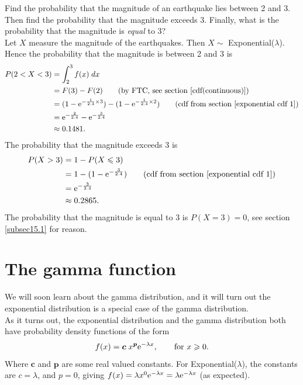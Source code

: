 \noindent Find the probability that the magnitude of an earthquake lies between 2 and 3. Then find the probability that the magnitude exceeds 3. Finally, what is the probability that the magnitude is \textit{equal} to 3? \\

\solution
Let $X$ measure the magnitude of the earthquakes. Then $X \sim$ Exponential($\lambda$). Hence the probability that the magnitude is between 2 and 3 is
\begin{align*}
P(2 < X < 3) & = \int_2^3 f(x) \; dx \\
		& = F(3) - F(2) \tag{by FTC, see section \ref{cdf(continuous)}} \\
		& = (1-\e^{-\frac{1}{2.4}\times3}) - (1-\e^{-\frac{1}{2.4}\times2}) \tag{cdf from section \ref{exponential cdf 1}} \\
		& = \e^{-\frac{2}{2.4}} - \e^{-\frac{3}{2.4}} \\
		& \approx 0.1481.
\end{align*}
The probability that the magnitude exceeds 3 is
\begin{align*}
P(X > 3) & = 1 - P(X \leq 3) \\
	& =1 - (1 - \e^{-\frac{3}{2.4}}) \tag{cdf from section \ref{exponential cdf 1}} \\
	& = \e^{-\frac{3}{2.4}} \\
	& \approx 0.2865.
\end{align*}
The probability that the magnitude is equal to 3 is $P(X = 3) = 0$, see section \ref{subsec15.1} for reason.

\section{The gamma function} \label{gamma function}
\noindent We will soon learn about the gamma distribution, and it will turn out the exponential distribution is a special case of the gamma distribution. \\

\noindent As it turns out, the exponential distribution and the gamma distribution both have probability density functions of the form
\[
f(x) = \boldsymbol{c}\;x^{\boldsymbol{p}} \mathrm{e}^{-\lambda x}, \qquad \text{for $x \geqslant 0$}.
\]
Where $ \boldsymbol{c}$ and $ \boldsymbol{p}$ are some real valued constants. For Exponential($\lambda$), the constants are $c = \lambda$, and $p = 0$, giving $f(x) = \lambda x^0 \mathrm{e}^{-\lambda x} = \lambda \mathrm{e}^{-\lambda x}$ (as expected). \\

